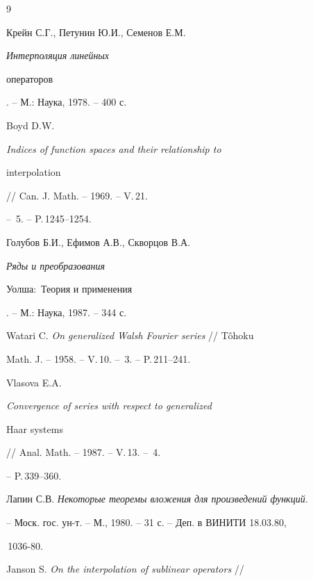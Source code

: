 \begin{thebibliography}{9}







Крейн С.Г., Петунин Ю.И., Семенов Е.М. {\em Интерполяция линейных 


операторов}. -- М.: Наука, 1978. -- 400 с.







Boyd D.W. {\em Indices of function spaces and their relationship to 


interpolation} // Can. J. Math. -- 1969. -- V.\,21.


-- \No\,5. -- P.\,1245--1254.







Голубов Б.И., Ефимов А.В., Скворцов В.А. {\em Ряды и преобразования


Уолша$:$ Теория и применения}. -- М.: Наука, 1987. -- 344 с.







Watari C. {\em On generalized Walsh Fourier series} // T\^o{}hoku %


Math. J. -- 1958. -- V.\,10. -- \No\,3. -- P.\,211--241.







Vlasova E.A. {\em Convergence of series with respect to generalized


Haar systems} // Anal. Math. -- 1987. -- V.\,13. -- \No\,4.


-- P.\,339--360.







Лапин С.В. {\em Некоторые теоремы вложения для произведений функций}. 


-- Моск. гос. ун-т. -- М., 1980. -- 31 с. -- Деп. в ВИНИТИ 18.03.80,


\No\,1036-80. 







Janson S. {\em On the interpolation of sublinear operators} // 



\end{thebibliography}
